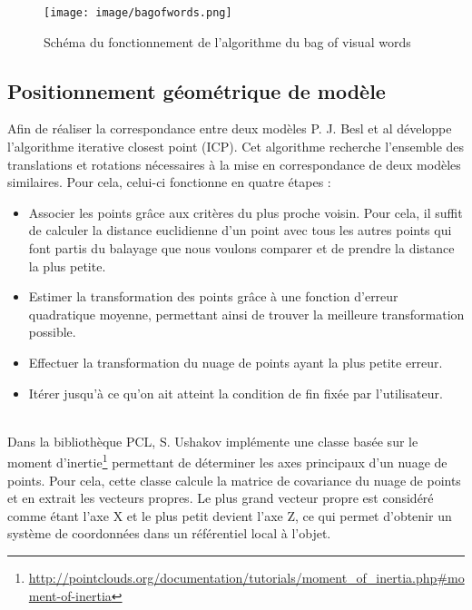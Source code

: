 \begin{figure}[!ht]
  \begin{center}
    \texttt{[image: image/bagofwords.png]}
    \caption[The LOF caption]{Schéma du fonctionnement de l'algorithme du bag of visual words\footnotemark }
  \end{center}
\end{figure}

\subsection{Positionnement géométrique de modèle}
Afin de réaliser la correspondance entre deux modèles P. J. Besl et al\cite{ICP} développe l'algorithme \og iterative closest point \fg (ICP).
Cet algorithme recherche l'ensemble des translations et rotations nécessaires à la mise en correspondance de deux modèles similaires. Pour cela,
celui-ci fonctionne en quatre étapes :
\begin{itemize}
  \item Associer les points grâce aux critères du plus proche voisin. Pour cela, il suffit de calculer la distance euclidienne d'un
   point avec tous les autres points qui font partis du balayage que nous voulons comparer et de prendre la distance la plus petite.
  \item Estimer la transformation des points grâce à une fonction d'erreur quadratique moyenne, permettant ainsi de trouver la meilleure
  transformation possible.
  \item Effectuer la transformation du nuage de points ayant la plus petite erreur.
  \item Itérer jusqu'à ce qu'on ait atteint la condition de fin fixée par l'utilisateur.
\end{itemize}
\ \\
Dans la bibliothèque PCL\cite{PCL}, S. Ushakov implémente une classe basée sur le moment d'inertie\footnote{\url{http://pointclouds.org/documentation/tutorials/moment\_of\_inertia.php\#moment-of-inertia}}
permettant de déterminer les axes principaux d'un nuage de points. Pour cela, cette classe calcule la matrice de covariance du nuage de points et 
en extrait les vecteurs propres. Le plus grand vecteur propre est considéré comme étant l'axe X et le plus petit devient l'axe Z, ce qui permet 
d'obtenir un système de coordonnées dans un référentiel local à l'objet.\\   

